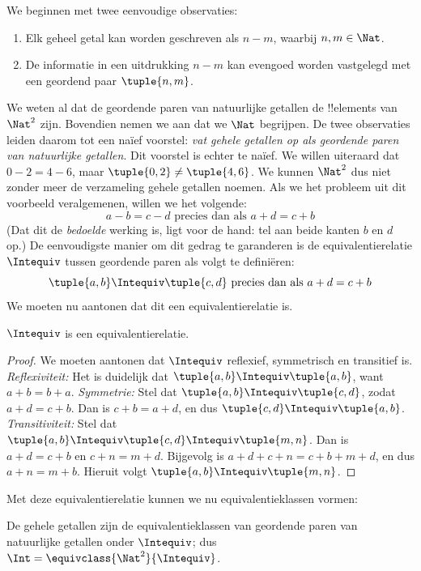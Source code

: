 \documentclass[../../../include/open-logic-section]{subfiles}
\begin{document}
We beginnen met twee eenvoudige observaties:
	\begin{enumerate}
		\item Elk geheel getal kan worden geschreven als $n - m$, waarbij $n, m \in\Nat$.
		\item De informatie in een uitdrukking $n - m$ kan evengoed worden vastgelegd met een geordend paar $\tuple{n, m}$.
	\end{enumerate}
We weten al dat de geordende paren van natuurlijke getallen de !!{element}s
van $\Nat^2$ zijn. Bovendien nemen we aan dat we $\Nat$ begrijpen. De
twee observaties leiden daarom tot een na\"{i}ef voorstel: \emph{vat
gehele getallen op als geordende paren van natuurlijke getallen}.
Dit voorstel is echter te na\"{i}ef. We willen uiteraard dat $0- 2 = 4
- 6$, maar $\tuple{0, 2 }\neq \tuple{4, 6}$. We kunnen $\Nat^2$ dus
niet zonder meer de verzameling gehele getallen noemen.
Als we het probleem uit dit voorbeeld veralgemenen, willen we het volgende:
	$$a - b = c - d \text{ precies dan als }a + d = c + b$$
(Dat dit de \emph{bedoelde} werking is, ligt voor de hand: tel aan beide
kanten $b$ en $d$ op.) De eenvoudigste manier om dit gedrag te
garanderen is de equivalentierelatie $\Intequiv$ tussen geordende paren
als volgt te definiëren:
$$\tuple{ a, b } \Intequiv \tuple{c, d}\text{ precies dan als }a + d = c + b$$
We moeten nu aantonen dat dit een equivalentierelatie is.
\begin{prop} $\Intequiv$ is een equivalentierelatie.
\end{prop}
	\begin{proof}
	We moeten aantonen dat $\Intequiv$ reflexief, symmetrisch en transitief is.
	\emph{Reflexiviteit:} Het is duidelijk dat $\tuple{a, b} \Intequiv \tuple{a, b}$,
	want $a + b = b + a$.
	\emph{Symmetrie:} Stel dat $\tuple{a, b} \Intequiv \tuple{c, d}$,
	zodat $a + d = c + b$. Dan is $c + b = a + d$, en dus
	$\tuple{c, d} \Intequiv \tuple{a, b}$.
	\emph{Transitiviteit:} Stel dat $\tuple{a, b} \Intequiv \tuple{c,
	d}\Intequiv \tuple{m, n}$. Dan is $a + d = c + b$ en $c + n = m +
	d$. Bijgevolg is $a + d + c + n = c + b + m + d$, en dus $a + n =
	m + b$. Hieruit volgt $\tuple{a, b } \Intequiv \tuple{m, n}$.
\end{proof}
Met deze equivalentierelatie kunnen we nu equivalentieklassen vormen:
\begin{defn}
		De gehele getallen zijn de equivalentieklassen van geordende paren
		van natuurlijke getallen onder $\Intequiv$; dus $\Int =
		\equivclass{\Nat^2}{\Intequiv}$.
\end{defn}
\end{document}
